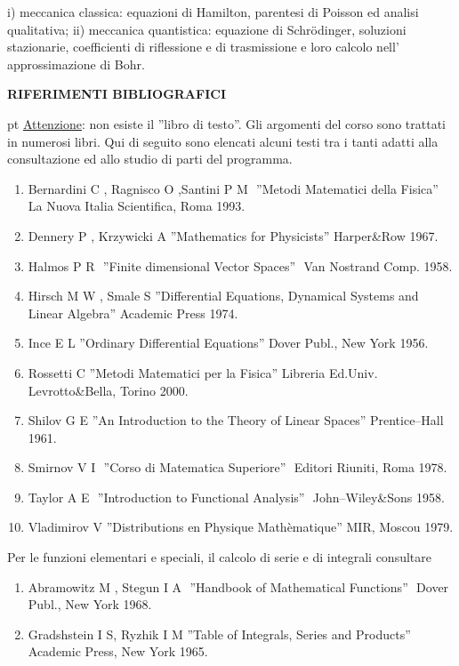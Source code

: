 \documentclass[a4paper,10pt]{article}
\begin{document}
i) meccanica classica: equazioni di Hamilton, parentesi di Poisson ed analisi qualitativa;
ii) meccanica quantistica: equazione di Schr\"{o}dinger, soluzioni stazionarie, coefficienti di riflessione e di trasmissione e loro calcolo nell' approssimazione di Bohr.
\newpage
\centerline{\textbf{RIFERIMENTI BIBLIOGRAFICI}} 
 pt
\noindent
\underline{Attenzione}: non esiste il ''libro di testo''. Gli argomenti  del corso sono trattati in numerosi libri. Qui di seguito sono elencati alcuni testi tra i tanti adatti alla consultazione ed allo studio di parti del programma.
\begin{enumerate}
\item Bernardini C , Ragnisco O ,Santini P M \,\,''Metodi Matematici della Fisica''\,\,La Nuova Italia Scientifica, Roma 1993.
\item Dennery P , Krzywicki A\,\,''Mathematics for Physicists''\,\,Harper\&Row 1967.
\item Halmos P R \,\,''Finite dimensional Vector Spaces'' \,\,Van Nostrand Comp. 1958.
\item Hirsch M W , Smale S\,\,''Differential Equations, Dynamical Systems and Linear Algebra''\,\,Academic Press 1974.
\item Ince E L\,\,''Ordinary Differential Equations''\,\,Dover Publ., New York 1956.
\item Rossetti C\,\,''Metodi Matematici per la Fisica''\,\,Libreria Ed.Univ. Levrotto\&Bella, Torino 2000.
\item Shilov G E\,\,''An Introduction to the Theory of Linear Spaces''\,\,Prentice--Hall 1961.
\item  Smirnov V I \,\,''Corso di Matematica Superiore''\,\, Editori Riuniti, Roma 1978.
\item Taylor A E \,\,''Introduction to Functional Analysis''\,\, John--Wiley\&Sons 1958.
\item Vladimirov V\,\,''Distributions en Physique Math\`ematique''\,\,MIR, Moscou 1979.
\end{enumerate}
\noindent
Per le funzioni elementari e speciali, il calcolo di serie e di integrali consultare
\begin{enumerate}
\item Abramowitz M , Stegun I A \,\,''Handbook of Mathematical Functions''\,\, Dover Publ., New York 1968.
\item Gradshstein I S, Ryzhik I M\,\,''Table of Integrals, Series and Products''\,\,Academic Press, New York 1965.
\end {enumerate}
\end{document}
